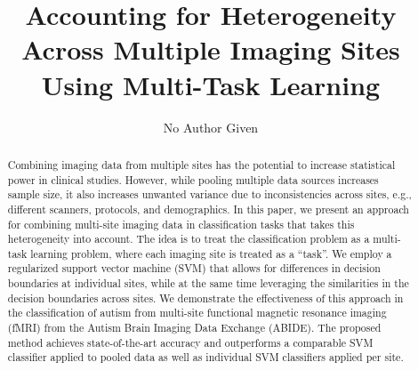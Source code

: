 \documentclass{llncs}
\begin{document}
\pagestyle{plain}

\mainmatter

\title{Accounting for Heterogeneity Across Multiple Imaging Sites Using Multi-Task
  Learning}
%
%
\author{No Author Given}

\maketitle

\begin{abstract}
Combining imaging data from multiple sites has the potential to increase
statistical power in clinical studies. However, while pooling multiple data
sources increases sample size, it also increases unwanted variance due to
inconsistencies across sites, e.g., different scanners, protocols, and
demographics. In this paper, we present an approach for combining multi-site
imaging data in classification tasks that takes this heterogeneity into
account. The idea is to treat the classification problem as a multi-task
learning problem, where each imaging site is treated as a ``task''. We employ a
regularized support vector machine (SVM) that allows for differences in decision
boundaries at individual sites, while at the same time leveraging the
similarities in the decision boundaries across sites. We demonstrate the
effectiveness of this approach in the classification of autism from multi-site
functional magnetic resonance imaging (fMRI) from the Autism Brain Imaging Data
Exchange (ABIDE). The proposed method achieves state-of-the-art accuracy and
outperforms a comparable SVM classifier applied to pooled data as well as
individual SVM classifiers applied per site.

\end{abstract}
\end{document}
